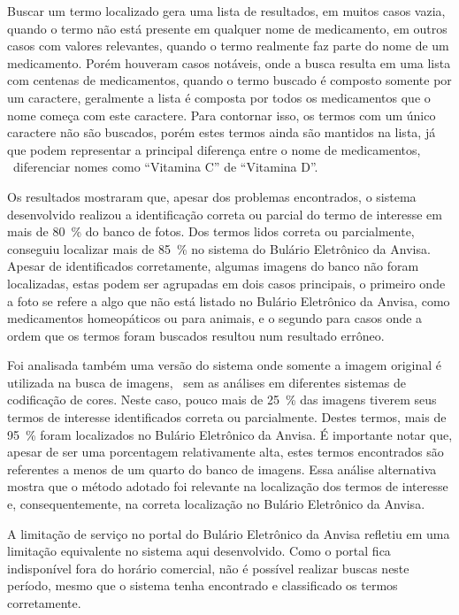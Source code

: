 Buscar um termo localizado gera uma lista de resultados, em muitos casos vazia, quando o termo não está presente em qualquer nome de medicamento, em outros casos com valores relevantes, quando o termo realmente faz parte do nome de um medicamento.
Porém houveram casos notáveis, onde a busca resulta em uma lista com centenas de medicamentos, quando o termo buscado é composto somente por um caractere, geralmente a lista é composta por todos os medicamentos que o nome começa com este caractere.
Para contornar isso, os termos com um único caractere não são buscados, porém estes termos ainda são mantidos na lista, já que podem representar a principal diferença entre o nome de medicamentos, \eg\ diferenciar nomes como ``Vitamina C'' de ``Vitamina D''.

Os resultados mostraram que, apesar dos problemas encontrados, o sistema desenvolvido realizou a identificação correta ou parcial do termo de interesse em mais de \SI{80}{\percent} do banco de fotos.
Dos termos lidos correta ou parcialmente, conseguiu localizar mais de \SI{85}{\percent} no sistema do Bulário Eletrônico da \ac{Anvisa}.
Apesar de identificados corretamente, algumas imagens do banco não foram localizadas, estas podem ser agrupadas em dois casos principais, o primeiro onde a foto se refere a algo que não está listado no Bulário Eletrônico da Anvisa, como medicamentos homeopáticos ou para animais, e o segundo para casos onde a ordem que os termos foram buscados resultou num resultado errôneo.

Foi analisada também uma versão do sistema onde somente a imagem original é utilizada na busca de imagens, \ie\ sem as análises em diferentes sistemas de codificação de cores.
Neste caso, pouco mais de \SI{25}{\percent} das imagens tiverem seus termos de interesse identificados correta ou parcialmente.
Destes termos, mais de \SI{95}{\percent} foram localizados no Bulário Eletrônico da \ac{Anvisa}.
É importante notar que, apesar de ser uma porcentagem relativamente alta, estes termos encontrados são referentes a menos de um quarto do banco de imagens.
Essa análise alternativa mostra que o método adotado foi relevante na localização dos termos de interesse e, consequentemente, na correta localização no Bulário Eletrônico da \ac{Anvisa}.

A limitação de serviço no portal do Bulário Eletrônico da \ac{Anvisa} refletiu em uma limitação equivalente no sistema aqui desenvolvido.
Como o portal fica indisponível fora do horário comercial, não é possível realizar buscas neste período, mesmo que o sistema tenha encontrado e classificado os termos corretamente.

